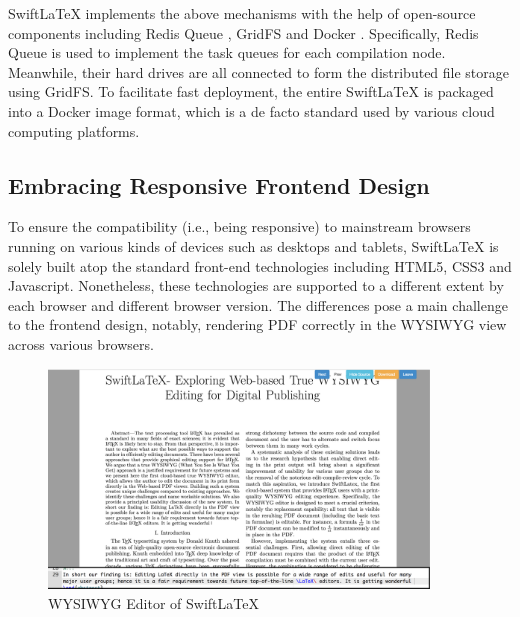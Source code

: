 \documentclass[sigconf]{acmart}
\begin{document}
SwiftLaTeX implements the above mechanisms with the help of open-source components including Redis Queue \cite{carlson2013redis}, GridFS \cite{banker2011mongodb} and Docker \cite{merkel2014docker}. 
Specifically, Redis Queue is used to implement the task queues for each compilation node. Meanwhile, their hard drives are all connected to form the distributed file storage using GridFS. To facilitate fast deployment, the entire SwiftLaTeX is packaged into a Docker image format, which is a de facto standard used by various cloud computing platforms.



\subsection{Embracing Responsive Frontend Design}
To ensure the compatibility (i.e., being responsive) to mainstream browsers running on various kinds of devices such as desktops and tablets, SwiftLaTeX is solely built atop the standard front-end technologies including HTML5, CSS3 and Javascript. 
Nonetheless, these technologies are supported to a different extent by each browser and different browser version. 
The differences pose a main challenge to the frontend design, notably, rendering PDF correctly  in the WYSIWYG view across various browsers.


\begin{figure}[t]

\begin{center}
\includegraphics[width=0.90\textwidth]{figure/screenshot}
\caption{WYSIWYG Editor of SwiftLaTeX}
\label{fig:screenshot}
\end{center}
\vspace{-0.1in}
\end{figure} 
\end{document}
